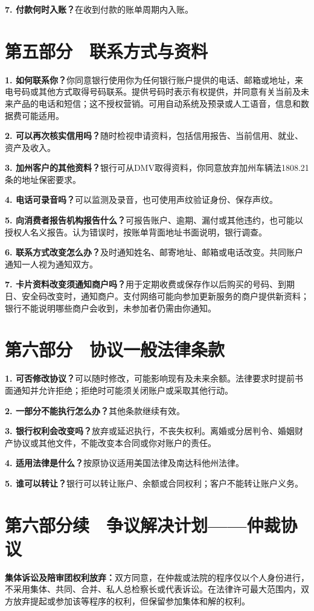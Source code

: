 \documentclass[UTF8,fontset=none,11pt,a4paper]{ctexart}
\begin{document}
\textbf{7. 付款何时入账？}在收到付款的账单周期内入账。


\section*{第五部分　联系方式与资料}
\textbf{1. 如何联系你？}你同意银行使用你为任何银行账户提供的电话、邮箱或地址，来电号码或其他方式取得号码联系。提供号码时表示有权提供，并同意有关当前及未来产品的电话和短信；这不授权营销。可用自动系统及预录或人工语音，信息和数据费可能适用。


\textbf{2. 可以再次核实信用吗？}随时检视申请资料，包括信用报告、当前信用、就业、资产及收入。


\textbf{3. 加州客户的其他资料？}银行可从DMV取得资料，你同意放弃加州车辆法1808.21条的地址保密要求。


\textbf{4. 电话可录音吗？}可以监测及录音，也可使用声纹验证身份、保存声纹。


\textbf{5. 向消费者报告机构报告什么？}可报告账户、逾期、漏付或其他违约，也可能以授权人名义报告。认为错误时，按账单背面地址书面说明，银行调查。


\textbf{6. 联系方式改变怎么办？}及时通知姓名、邮寄地址、邮箱或电话改变。共同账户通知一人视为通知双方。


\textbf{7. 卡片资料改变须通知商户吗？}用于定期收费或保存作以后购买的号码、到期日、安全码改变时，通知商户。支付网络可能向参加更新服务的商户提供新资料；银行不能说明哪些商户会收到，未参加者仍需由你通知。


\section*{第六部分　协议一般法律条款}
\textbf{1. 可否修改协议？}可以随时修改，可能影响现有及未来余额。法律要求时提前书面通知并允许拒绝；拒绝时可能须关闭账户或采取其他行动。


\textbf{2. 一部分不能执行怎么办？}其他条款继续有效。


\textbf{3. 银行权利会改变吗？}放弃或延迟执行，不丧失权利。离婚或分居判令、婚姻财产协议或其他文件，不能改变本合同或你对账户的责任。


\textbf{4. 适用法律是什么？}按原协议适用美国法律及南达科他州法律。


\textbf{5. 谁可以转让？}银行可以转让账户、余额或合同权利；客户不能转让账户义务。


\section*{第六部分续　争议解决计划——仲裁协议}
\textbf{集体诉讼及陪审团权利放弃：}双方同意，在仲裁或法院的程序仅以个人身份进行，不采用集体、共同、合并、私人总检察长或代表诉讼。在法律许可最大范围内，双方放弃提起或参加该等程序的权利，但保留参加集体和解的权利。
\end{document}
